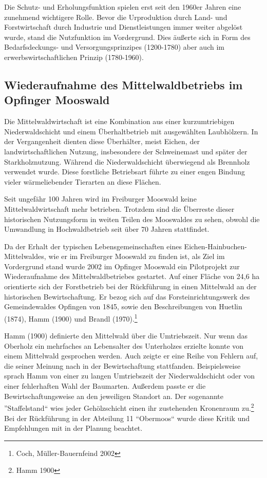 \documentclass[12pt]{article}
\begin{document}
Die Schutz- und Erholungsfunktion spielen erst seit den 1960er Jahren eine zunehmend wichtigere Rolle.
Bevor die Urproduktion durch Land- und Forstwirtschaft durch Industrie und Dienstleistungen immer weiter
abgelöst wurde, stand die Nutzfunktion im Vordergrund. Dies äußerte sich in Form des Bedarfsdeckungs-
und Versorgungsprinzipes (1200-1780) aber auch im erwerbswirtschaftlichen Prinzip (1780-1960).

\subsection*{Wiederaufnahme des Mittelwaldbetriebs im Opfinger Mooswald}
Die Mittelwaldwirtschaft ist eine Kombination aus einer kurzumtriebigen Niederwaldschicht und einem Überhaltbetrieb
mit ausgewählten Laubhölzern. In der Vergangenheit dienten diese Überhälter, meist Eichen, der landwirtschaftlichen
Nutzung, insbesondere der Schweinemast und später der Starkholznutzung. Während die Niederwaldschicht überwiegend
als Brennholz verwendet wurde. Diese forstliche Betriebsart führte zu einer engen Bindung vieler wärmeliebender 
Tierarten an diese Flächen. 

Seit ungefähr 100 Jahren wird im Freiburger Mooswald keine Mittelwaldwirtschaft mehr betrieben. Trotzdem 
sind die Überreste dieser historischen Nutzungsform in weiten Teilen des Mooswaldes zu sehen, obwohl die
Umwandlung in Hochwaldbetrieb seit über 70 Jahren stattfindet.

Da der Erhalt der typischen Lebensgemeinschaften eines Eichen-Hainbuchen-Mittelwaldes, wie er im Freiburger 
Mooswald zu finden ist, als Ziel im Vordergrund stand wurde 2002 im Opfinger Mooswald ein Pilotprojekt
zur Wiederaufnahme des Mittelwaldbetriebes gestartet. Auf einer Fläche von 24,6 ha orientierte sich der Forstbetrieb
bei der Rückführung in einen Mittelwald an der historischen Bewirtschaftung. Er bezog sich auf das
Forsteinrichtungswerk des Gemeindewaldes Opfingen von 1845, sowie den Beschreibungen von Huetlin (1874),
Hamm (1900) und Brandl (1970).\footnote{Coch, Müller-Bauernfeind 2002}

Hamm (1900) definierte den Mittelwald über die Umtriebszeit. Nur wenn das Oberholz ein mehrfaches an Lebensalter
des Unterholzes erzielte konnte von einem Mittelwald gesprochen werden. Auch zeigte er eine Reihe von
Fehlern auf, die seiner Meinung nach in der Bewirtschaftung stattfanden. Beispielsweise sprach Hamm von einer
zu langen Umtriebszeit der Niederwaldschicht oder von einer fehlerhaften Wahl der Baumarten. Außerdem
passte er die Bewirtschaftungsweise an den jeweiligen Standort an. Der sogenannte ''Staffelstand`` wies jeder
Gehölzschicht einen ihr zustehenden Kronenraum zu.\footnote{Hamm 1900}
Bei der Rückführung in der Abteilung 11 ``Obermoos`` wurde diese Kritik und Empfehlungen mit in der Planung beachtet.
\end{document}
